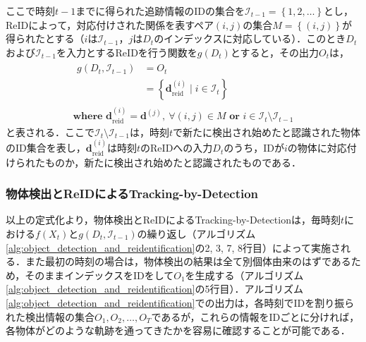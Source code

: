         ここで時刻$t-1$までに得られた追跡情報のIDの集合を$\mathcal{I}_{t-1} = \left\{1, 2, \dots\right\}$とし，ReIDによって，対応付けされた関係を表すペア$(i, j)$の集合$M = \left\{(i, j)\right\}$が得られたとする（$i$は$\mathcal{I}_{t-1}$，$j$は$D_t$のインデックスに対応している）．このとき$D_t$および$\mathcal{I}_{t-1}$を入力とするReIDを行う関数を$g(D_t)$とすると，その出力$O_t$は，
        \begin{equation}
            \label{eq:output_of_reid}
            \begin{gathered}
                \begin{aligned}
                    g(D_t, \mathcal{I}_{t-1}) &= O_t
                    \\ &= \left\{\bm{d}_{\text{reid}}^{(i)} \mid i \in \mathcal{I}_t\right\}
                \end{aligned}
                \\ \textbf{where } \bm{d}_{\text{reid}}^{(i)} = \bm{d}^{(j)}, ~ \forall (i, j) \in M \textbf{ or } i \in \mathcal{I}_t \setminus \mathcal{I}_{t-1}
            \end{gathered}
        \end{equation}
        と表される．ここで$\mathcal{I}_t \setminus \mathcal{I}_{t-1}$は，時刻$t$で新たに検出され始めたと認識された物体のID集合を表し，$\bm{d}_{\text{reid}}^{(i)}$は時刻$t$のReIDへの入力$D_t$のうち，IDが$i$の物体に対応付けられたものか，新たに検出され始めたと認識されたものである．

        \subsubsection{物体検出とReIDによるTracking-by-Detection}
        以上の定式化より，物体検出とReIDによるTracking-by-Detectionは，毎時刻$t$における$f(X_t)$と$g(D_t, \mathcal{I}_{t-1})$の繰り返し（アルゴリズム\ref{alg:object_detection_and_reidentification}の2, 3, 7, 8行目）によって実施される．また最初の時刻の場合は，物体検出の結果は全て別個体由来のはずであるため，そのままインデックスをIDをして$O_1$を生成する（アルゴリズム\ref{alg:object_detection_and_reidentification}の5行目）．アルゴリズム\ref{alg:object_detection_and_reidentification}での出力は，各時刻でIDを割り振られた検出情報の集合$O_1, O_2, \dots, O_T$であるが，これらの情報をIDごとに分ければ，各物体がどのような軌跡を通ってきたかを容易に確認することが可能である．

